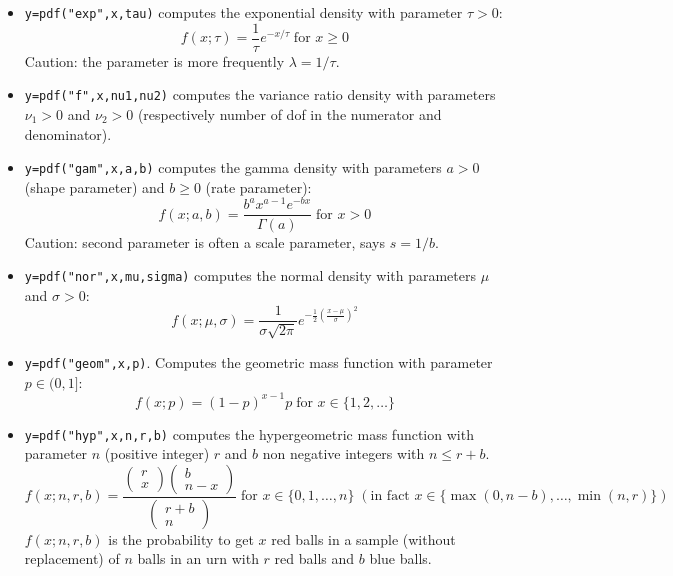 \begin{mandescription}
\begin{itemize}
\item {} \verb!y=pdf("exp",x,tau)! computes the exponential
  density with parameter $\tau > 0$:
$$
     f(x; \tau) = \frac{1}{\tau} e^{-x/\tau} \; \mbox{for } x
     \ge 0
$$
Caution: the parameter is more frequently $\lambda = 1/\tau$.


\item {} \verb!y=pdf("f",x,nu1,nu2)! computes
  the variance ratio density with parameters $\nu_1 > 0$ and $\nu_2 >
  0$ (respectively number of dof in the numerator and denominator).


\item {} \verb!y=pdf("gam",x,a,b)! computes the gamma
  density with parameters $a > 0$ (shape parameter) and $b \ge 0$
  (rate parameter):
$$
     f(x; a, b) = \frac{ b^a x^{a-1} e^{-bx} } {\Gamma(a)}\; \mbox{for } x > 0
$$
Caution: second parameter is often a scale parameter, says $s = 1/b$.

\item {} \verb!y=pdf("nor",x,mu,sigma)! computes the normal
  density with parameters $\mu$ and $\sigma > 0$:
$$
     f(x; \mu, \sigma) = \frac{ 1 }{ \sigma \sqrt{2\pi}}
     e^{-\frac{1}{2} \left( \frac{x-\mu}{\sigma} \right)^2 }
$$


\item {} \verb!y=pdf("geom",x,p)!. Computes
  the geometric mass function with parameter $p \in (0,1]$:
$$
     f(x; p) = (1-p)^{x-1} p \;\mbox{for } x \in \{1, 2, \dots\}
$$

\item {} \verb!y=pdf("hyp",x,n,r,b)! computes
  the hypergeometric mass function with parameter $n$ (positive
  integer) $r$ and $b$ non negative integers with $n \le r + b$. 
$$
     f(x; n, r,b) = 
    \frac{\left(\begin{array}{c}r\\x\end{array}\right)
          \left(\begin{array}{c}b\\n-x\end{array}\right)}
         {\left(\begin{array}{c}r+b\\n\end{array}\right)}
         \;\mbox{for } x \in \{0, 1, \dots, n\} \; (\mbox{in fact }x \in \{\max(0,n-b),\dots, \min(n,r)\})
$$
$f(x; n,r,b)$ is the probability to get $x$ red balls
in a sample (without replacement) of $n$ balls in an urn
with $r$ red balls and $b$ blue balls.



\end{itemize}
\end{mandescription}
